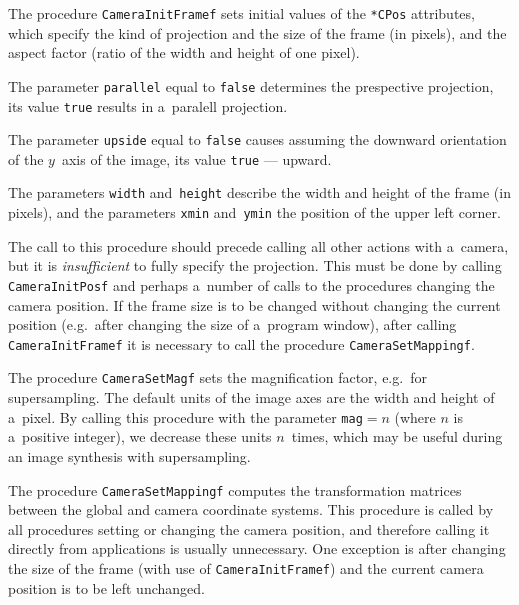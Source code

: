 \hspace*{\parindent}The procedure \texttt{CameraInitFramef} sets initial
values of the \texttt{*CPos} attributes, which specify the kind of
projection and the size of the frame (in pixels), and the aspect factor
(ratio of the width and height of one pixel).

\begin{sloppypar}
The parameter \texttt{parallel} equal to \texttt{false} determines the
prespective projection, its value \texttt{true} results in a~paralell
projection.%
\end{sloppypar}

\begin{sloppypar}
The parameter \texttt{upside} equal to \texttt{false} causes assuming the
downward orientation of the $y$~axis of the image, its value
\texttt{true} --- upward.%
\end{sloppypar}

The parameters \texttt{width} and~\texttt{height} describe the width and
height of the frame (in pixels), and the parameters \texttt{xmin}
and~\texttt{ymin} the position of the upper left corner.

The call to this procedure should precede calling all other actions with
a~camera, but it is \emph{insufficient} to fully specify the projection.
This must be done by calling \texttt{CameraInitPosf} and perhaps a~number of
calls to the procedures changing the camera position. If the frame size is
to be changed without changing the current position (e.g.\ after changing
the size of a~program window), after calling \texttt{CameraInitFramef}
it is necessary to call the procedure \texttt{CameraSetMappingf}.

\vspace{\bigskipamount}
The procedure \texttt{CameraSetMagf} sets the magnification factor, e.g.\
for supersampling. The default units of the image axes are the width and
height of a~pixel. By calling this procedure with the parameter
\texttt{mag}${}=n$ (where $n$ is a~positive integer),
we decrease these units $n$~times, which may be useful during an image
synthesis with supersampling.

\vspace{\bigskipamount}
The procedure \texttt{CameraSetMappingf} computes the transformation
matrices between the global and camera coordinate systems. This procedure
is called by all procedures setting or changing the camera position,
and therefore calling it directly from applications is usually unnecessary.
One exception is after changing the size of the frame (with use of
\texttt{CameraInitFramef}) and the current camera position is to be left
unchanged.

